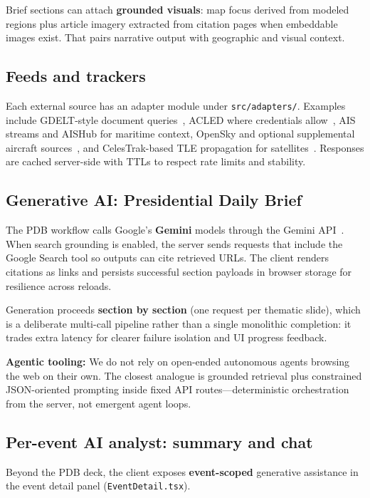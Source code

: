 Brief sections can attach \textbf{grounded visuals}: map focus derived from modeled regions plus article imagery extracted from citation pages when embeddable images exist. That pairs narrative output with geographic and visual context.

\subsection{Feeds and trackers}

Each external source has an adapter module under \texttt{src/adapters/}. Examples include GDELT-style document queries~\cite{gdelt}, ACLED where credentials allow~\cite{acled}, AIS streams and AISHub for maritime context, OpenSky and optional supplemental aircraft sources~\cite{opensky}, and CelesTrak-based TLE propagation for satellites~\cite{celestrak}. Responses are cached server-side with TTLs to respect rate limits and stability.

\subsection{Generative AI: Presidential Daily Brief}

The PDB workflow calls Google's \textbf{Gemini} models through the Gemini API~\cite{gemini-api}. When search grounding is enabled, the server sends requests that include the Google Search tool so outputs can cite retrieved URLs.
The client renders citations as links and persists successful section payloads in browser storage for resilience across reloads.

Generation proceeds \textbf{section by section} (one request per thematic slide), which is a deliberate multi-call pipeline rather than a single monolithic completion: it trades extra latency for clearer failure isolation and UI progress feedback.

\textbf{Agentic tooling:} We do not rely on open-ended autonomous agents browsing the web on their own. The closest analogue is grounded retrieval plus constrained JSON-oriented prompting inside fixed API routes---deterministic orchestration from the server, not emergent agent loops.

\subsection{Per-event AI analyst: summary and chat}

Beyond the PDB deck, the client exposes \textbf{event-scoped} generative assistance in the event detail panel (\texttt{EventDetail.tsx}).

